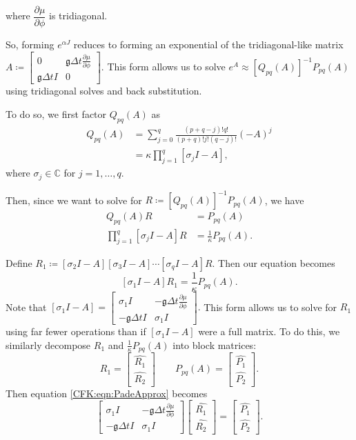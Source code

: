 \documentclass{csri19}
\newcommand{\CFKg}{\mathfrak{g}}
\begin{document}
where $\dfrac{\partial \mu}{\partial \phi}$ is tridiagonal.

So, forming $e^{\alpha J}$ reduces to forming an exponential of the 
tridiagonal-like matrix $A \coloneqq 
\begin{bmatrix}
   0              & \CFKg \Delta t \frac{\partial \mu}{\partial \phi} \\
 \CFKg \Delta t I & 0  \end{bmatrix}$. This form allows us to solve 
$e^A \approx \left[Q_{pq}(A)\right]^{-1}P_{pq}(A)$ using tridiagonal solves 
and back substitution.

To do so, we first factor $Q_{pq}(A)$ as
\begin{align*}
Q_{pq}(A) &= \sum_{j=0}^q\frac{(p+q-j)!q!}{(p+q)!j!(q-j)!}(-A)^j\\
          &= \kappa\prod_{j=1}^q\left[\sigma_jI-A\right],
\end{align*}
where $\sigma_j\in \mathbb{C}$ for $j=1,\dots,q$.

Then, since we want to solve for 
$R \coloneqq \left[Q_{pq}(A)\right]^{-1}P_{pq}(A)$, we have
\begin{align*}
Q_{pq}(A) R &= P_{pq}(A)\\
\prod_{j=1}^q\left[\sigma_jI-A\right]R &= \frac{1}{\kappa}P_{pq}(A).
\end{align*}

Define $R_1 \coloneqq \left[\sigma_2I-A\right]\left[\sigma_3I-A\right]
\cdots\left[\sigma_qI-A\right]R$. Then our equation becomes
\begin{equation}\label{CFK:eqn:PadeApprox} \left[\sigma_1I-A\right]R_1 
= \frac{1}{\kappa}P_{pq}(A).\end{equation} Note that
$\left[\sigma_1I-A\right] =
 \begin{bmatrix} \sigma_1 I  & -\CFKg\Delta t \frac{\partial\mu}{\partial\phi} \\
 -\CFKg\Delta t I            & \sigma_1 I \end{bmatrix}.$ This form allows 
us to solve for $R_1$ using far fewer operations than if 
$\left[\sigma_1I-A\right]$ were a full matrix. To do this, we similarly 
decompose $R_1$ and $\frac{1}{\kappa}P_{pq}(A)$ into block matrices:
\[ R_1 = \begin{bmatrix} \hat{R_1} \\ \hat{R_2}\end{bmatrix} \qquad P_{pq}(A) = \begin{bmatrix} \hat{P_1} \\ \hat{P_2}\end{bmatrix}.\]
Then equation \ref{CFK:eqn:PadeApprox} becomes
\[\begin{bmatrix} \sigma_1 I  & -\CFKg\Delta t \frac{\partial\mu}{\partial\phi} \\
           -\CFKg\Delta t I & \sigma_1 I \end{bmatrix}
\begin{bmatrix} \hat{R_1} \\
 \hat{R_2} \end{bmatrix} = 
\begin{bmatrix} \hat{P_1} \\
 \hat{P_2} \end{bmatrix}.\]
\end{document}
